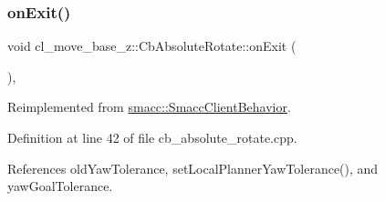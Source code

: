\mbox{\label{classcl__move__base__z_1_1CbAbsoluteRotate_a0e362b8e9f0d7de5aeee183ba4031437}} 
\subsubsection{\texorpdfstring{on\+Exit()}{onExit()}}
{\footnotesize\ttfamily void cl\+\_\+move\+\_\+base\+\_\+z\+::\+Cb\+Absolute\+Rotate\+::on\+Exit (\begin{DoxyParamCaption}{ }\end{DoxyParamCaption})\hspace{0.3cm}{\ttfamily [override]}, {\ttfamily [virtual]}}



Reimplemented from \hyperlink{classsmacc_1_1SmaccClientBehavior_ac0cd72d42bd00425362a97c9803ecce5}{smacc\+::\+Smacc\+Client\+Behavior}.



Definition at line 42 of file cb\+\_\+absolute\+\_\+rotate.\+cpp.



References old\+Yaw\+Tolerance, set\+Local\+Planner\+Yaw\+Tolerance(), and yaw\+Goal\+Tolerance.



